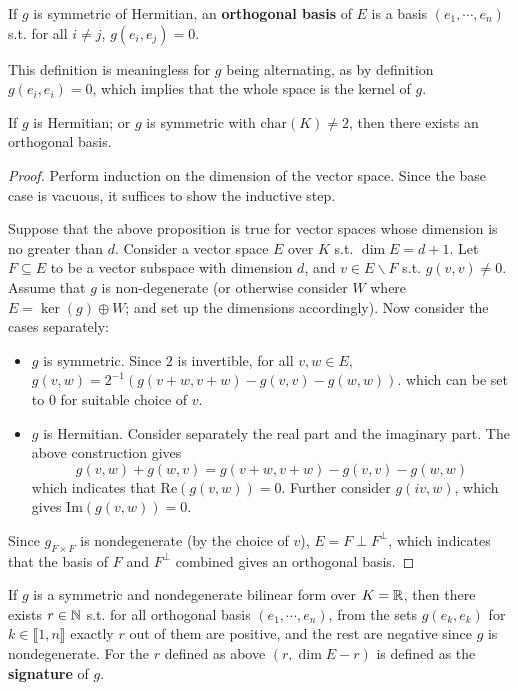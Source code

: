 \documentclass{article}
\begin{document}
\begin{definition}
    If $g$ is symmetric of Hermitian, an \textbf{orthogonal basis} of $E$ is a basis $(e_1, \cdots, e_n)$ s.t. for all $i \neq j$, $g(e_i, e_j) = 0$.
\end{definition}

\begin{remark}
    This definition is meaningless for $g$ being alternating, as by definition $g(e_i, e_i) = 0$, which implies that the whole space is the kernel of $g$.
\end{remark}

\begin{proposition}
    If $g$ is Hermitian; or $g$ is symmetric with $\text{char}(K) \neq 2$, then there exists an orthogonal basis.
\end{proposition}

\begin{proof}
    Perform induction on the dimension of the vector space. Since the base case is vacuous, it suffices to show the inductive step.

    Suppose that the above proposition is true for vector spaces whose dimension is no greater than $d$. Consider a vector space $E$ over $K$ s.t. $\dim E = d+1$. Let $F \subseteq E$ to be a vector subspace with dimension $d$, and $v \in E \smallsetminus F$ s.t. $g(v, v) \neq 0$. Assume that $g$ is non-degenerate (or otherwise consider $W$ where $E = \ker(g) \oplus W$; and set up the dimensions accordingly). Now consider the cases separately:
    \begin{itemize}
        \item $g$ is symmetric. Since $2$ is invertible, for all $v, w \in E$, $g(v, w) = 2^{-1}(g(v+w, v+w) - g(v, v) - g(w, w))$. which can be set to $0$ for suitable choice of $v$. 
        \item $g$ is Hermitian. Consider separately the real part and the imaginary part. The above construction gives
        \[
            g(v, w) + g(w, v) = g(v+w, v+w) - g(v, v) - g(w, w)
        \]
        which indicates that $\mathrm{Re}(g(v, w)) = 0$. Further consider $g(iv, w)$, which gives $\mathrm{Im}(g(v, w)) = 0$.
    \end{itemize}
    Since $g_{F\times F}$ is nondegenerate (by the choice of $v$), $E = F \perp F^{\perp}$, which indicates that the basis of $F$ and $F^{\perp}$ combined gives an orthogonal basis. 
\end{proof}

\begin{theorem}[Sylvester]
    If $g$ is a symmetric and nondegenerate bilinear form over $K = \mathbb{R}$, then there exists $r \in \mathbb{N}$ s.t. for all orthogonal basis $(e_1, \cdots, e_n)$, from the sets $g(e_k, e_k)$ for $k \in \llbracket 1, n \rrbracket$ exactly $r$ out of them are positive, and the rest are negative since $g$ is nondegenerate. For the $r$ defined as above $(r, \dim E - r)$ is defined as the \textbf{signature} of $g$.
\end{theorem}
\end{document}

